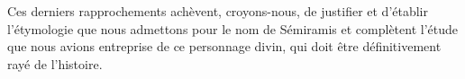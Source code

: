 \documentclass[a4paper, 11pt, oneside]{article}
\begin{document}
Ces derniers rapprochements achèvent, croyons-nous, de justifier et d'établir l'étymologie que nous admettons pour le nom de Sémiramis et complètent l'étude que nous avions entreprise de ce personnage divin, qui doit être définitivement rayé de l'histoire.

\bigskip \centerline{\EightStarTaper} \centerline{\EightStarTaper\EightStarTaper} \bigskip
\end{document}
